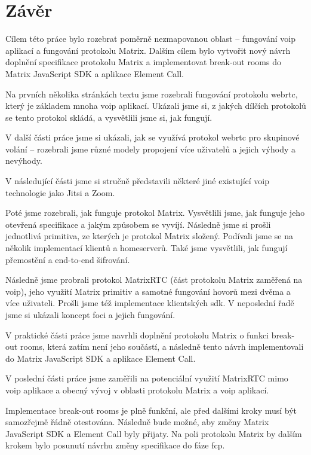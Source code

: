 \section{Závěr}

Cílem této práce bylo rozebrat poměrně nezmapovanou oblast -- fungování
\gls{voip} aplikací a fungování protokolu Matrix. Dalším cílem bylo vytvořit
nový návrh doplnění specifikace protokolu Matrix a implementovat break-out rooms
do Matrix JavaScript SDK a aplikace Element Call.

Na prvních několika stránkách textu jsme rozebrali fungování protokolu
\gls{webrtc}, který je základem mnoha \gls{voip} aplikací. Ukázali jsme si, z
jakých dílčích protokolů se tento protokol skládá, a vysvětlili jsme si, jak
fungují.

V další části práce jsme si ukázali, jak se využívá protokol \gls{webrtc} pro
skupinové volání -- rozebrali jsme různé modely propojení více uživatelů a
jejich výhody a nevýhody.

V následující části jsme si stručně představili některé jiné existující
\gls{voip} technologie jako Jitsi a Zoom.

Poté jsme rozebrali, jak funguje protokol Matrix. Vysvětlili jsme, jak funguje
jeho otevřená specifikace a jakým způsobem se vyvíjí. Následně jsme si prošli
jednotlivá primitiva, ze kterých je protokol Matrix složený. Podívali jsme se na
několik implementací klientů a homeserverů. Také jsme vysvětlili, jak fungují
přemostění a end-to-end šifrování.

Následně jsme probrali protokol MatrixRTC (část protokolu Matrix zaměřená na
\gls{voip}), jeho využití Matrix primitiv a samotné fungování hovorů mezi dvěma
a více uživateli. Prošli jsme též implementace klientských \gls{sdk}. V
neposlední řadě jsme si ukázali koncept foci a jejich fungování.

V praktické části práce jsme navrhli doplnění protokolu Matrix o funkci
break-out rooms, která zatím není jeho součástí, a následně tento návrh
implementovali do Matrix JavaScript SDK a aplikace Element Call.

V poslední části práce jsme zaměřili na potenciální využití MatrixRTC mimo
\gls{voip} aplikace a obecný vývoj v oblasti protokolu Matrix a \gls{voip}
aplikací.

Implementace break-out rooms je plně funkční, ale před dalšími kroky musí být
samozřejmě řádně otestována. Následně bude možné, aby změny Matrix JavaScript
SDK a Element Call byly přijaty. Na poli protokolu Matrix by dalším krokem bylo
posunutí návrhu změny specifikace do fáze \gls{fcp}.
